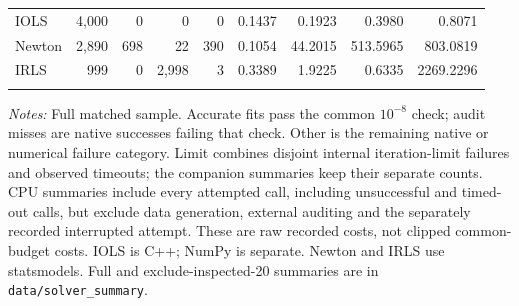 \begin{table}[p]
\begin{singlespace}
\begin{tabular}{@{}lrrrrrrrr@{}}
IOLS & 4,000 & 0 & 0 & 0 & 0.1437 & 0.1923 & 0.3980 & 0.8071\\
Newton & 2,890 & 698 & 22 & 390 & 0.1054 & 44.2015 & 513.5965 & 803.0819\\
IRLS & 999 & 0 & 2,998 & 3 & 0.3389 & 1.9225 & 0.6335 & 2269.2296\\
\addlinespace[2pt]
\bottomrule
\end{tabular}
\par\smallskip
\begin{minipage}{\linewidth}
\footnotesize\textit{Notes:} Full matched sample. Accurate fits pass the common \(10^{-8}\) check; audit misses are native successes failing that check. Other is the remaining native or numerical failure category. Limit combines disjoint internal iteration-limit failures and observed timeouts; the companion summaries keep their separate counts. CPU summaries include every attempted call, including unsuccessful and timed-out calls, but exclude data generation, external auditing and the separately recorded interrupted attempt. These are raw recorded costs, not clipped common-budget costs. IOLS is C++; NumPy is separate. Newton and IRLS use statsmodels. Full and exclude-inspected-20 summaries are in \texttt{data/solver\_summary}.
\end{minipage}
\end{singlespace}
\end{table}
